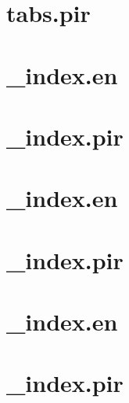 \let\mypdfximage\pdfximage\def\pdfximage{\immediate\mypdfximage}\documentclass[twoside]{book}
\newcommand{\+}{\discretionary{\mbox{\scriptsize$\hookleftarrow$}}{}{}}
\begin{document}
\chapter{tabs.\+pir}
\label{md_themes_relearn_exampleSite_content_shortcodes_tabs_pir}

\chapter{\+\_\+index.\+en}
\label{md_themes_relearn_exampleSite_content_showcase__index_en}

\chapter{\+\_\+index.\+pir}
\label{md_themes_relearn_exampleSite_content_showcase__index_pir}

\chapter{\+\_\+index.\+en}
\label{md_themes_relearn_exampleSite_content_tags__index_en}

\chapter{\+\_\+index.\+pir}
\label{md_themes_relearn_exampleSite_content_tags__index_pir}

\chapter{\+\_\+index.\+en}
\label{md_themes_relearn_exampleSite_content_tags_the_hidden__index_en}

\chapter{\+\_\+index.\+pir}
\label{md_themes_relearn_exampleSite_content_tags_the_hidden__index_pir}

\end{document}
